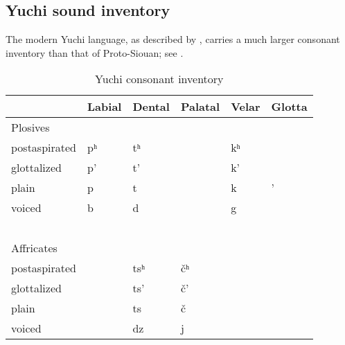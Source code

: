 \documentclass[output=paper]{LSP/langsci}
\begin{document}
\subsection{Yuchi sound inventory}

The modern Yuchi language, as described by \citet{Linn2000}, carries a much larger consonant inventory than that of Proto-Siouan; see .

\begin{table}[p]
\caption{Yuchi consonant inventory} \label{yuchiinventory}
    \begin{tabular}{llllll}\lsptoprule
    ~                           & Labial    &  Dental      &  Palatal        &  Velar      & Glotta  \\
    \midrule
     Plosives            & ~                   & ~                    & ~                       & ~                   & ~                \\
    postaspirated               & pʰ & tʰ  & ~                       & kʰ & ~                \\
    glottalized                 & p'                  & t'                   & ~                       & k'                  & ~                \\
    plain                       & p                   & t                    & ~                       & k                   & '                \\
    voiced                      & b                   & d                    & ~                       & g                   & ~                \\
    ~                           & ~                   & ~                    & ~                       & ~                   & ~                \\
    Affricates        & ~                   & ~                    & ~                       & ~                   & ~                \\
    postaspirated               & ~                   & tsʰ & \v{c}ʰ & ~                   & ~                \\
    glottalized                 & ~                   & ts'                  & \v{c}'                  & ~                   & ~                \\
    plain                       & ~                   & ts                   & \v{c}                   & ~                   & ~                \\
    voiced                      & ~                   & dz                   & j                  & ~                   & ~                \\

\end{tabular}
\end{table}
\end{document}

